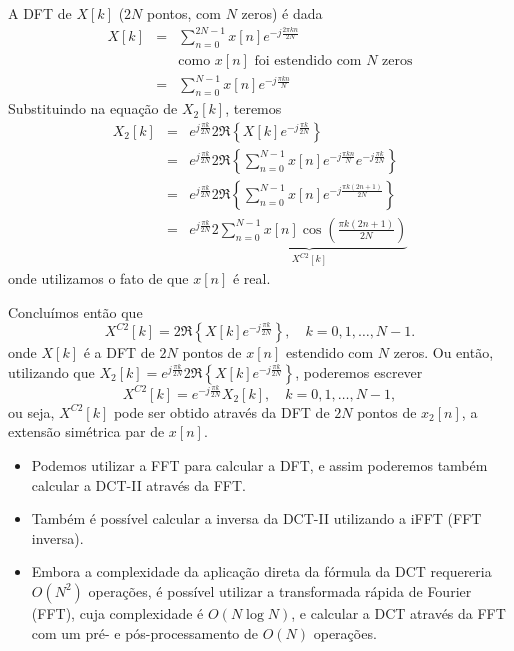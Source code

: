 \begin{frame}[allowframebreaks]
  A DFT de $X[k]$ ($2N$ pontos, com $N$ zeros) é dada
  \begin{eqnarray}
  X[k] &=& \sum_{n=0}^{2N-1} x[n] e^{-j \frac{2 \pi kn}{2N}} \\
        && \text{como $x[n]$ foi estendido com $N$ zeros} \\
        &=& \sum_{n=0}^{N-1} x[n] e^{-j \frac{\pi kn}{N}}
  \end{eqnarray}
  Substituindo na equação de $X_2[k]$, teremos
  \begin{eqnarray}
  X_2[k] &=& e^{j \frac{\pi k}{2N}} 2 \Re \left\{ X[k] e^{-j \frac{\pi k}{2N}} \right\} \\
        &=& e^{j \frac{\pi k}{2N}} 2 \Re \left\{ \sum_{n=0}^{N-1} x[n] e^{-j \frac{\pi kn}{N}} e^{-j \frac{\pi k}{2N}} \right\} \\
        &=& e^{j \frac{\pi k}{2N}} 2 \Re \left\{ \sum_{n=0}^{N-1} x[n] e^{-j \frac{\pi k (2n+1)}{2N}} \right\} \\
        &=& e^{j \frac{\pi k}{2N}} \underbrace{ 2 \sum_{n=0}^{N-1} x[n] \cos \left( \frac{\pi k (2n+1)}{2N} \right) }_{X^{C2}[k]}
  \end{eqnarray}
  onde utilizamos o fato de que $x[n]$ é real.

  Concluímos então que
  \begin{equation}
  X^{C2}[k] = 2 \Re \left\{ X[k] e^{-j \frac{\pi k}{2N}} \right\} , \quad k=0,1,\ldots,N-1.
  \end{equation}
  onde $X[k]$ é a DFT de $2N$ pontos de $x[n]$ estendido com $N$ zeros.
  Ou então, utilizando que $X_2[k] = e^{j \frac{\pi k}{2N}} 2 \Re \left\{ X[k] e^{-j \frac{\pi k}{2N}} \right\}$, poderemos escrever
  \begin{equation}
  X^{C2}[k] = e^{-j \frac{\pi k}{2N}} X_2[k] , \quad k=0,1,\ldots,N-1 ,
  \end{equation}
  ou seja, $X^{C2}[k]$ pode ser obtido através da DFT de $2N$ pontos de $x_2[n]$, a extensão simétrica par de $x[n]$.

  \begin{itemize}
  \item Podemos utilizar a FFT para calcular a DFT, e assim poderemos também calcular a DCT-II através da FFT.
  \item Também é possível calcular a inversa da DCT-II utilizando a iFFT (FFT inversa).
  \item Embora a complexidade da aplicação direta da fórmula da DCT requereria $O(N^2)$ operações, é possível utilizar a
        transformada rápida de Fourier (FFT), cuja complexidade é $O(N \log N)$, e calcular a DCT através da FFT com um
        pré- e pós-processamento de $O(N)$ operações.
  \end{itemize}

\end{frame}

